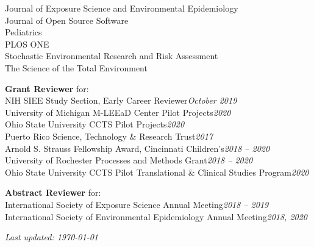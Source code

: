 \documentclass[margin,line]{res}
\newenvironment{list3}{
  \begin{list}{}{%
      \setlength{\itemsep}{0in}
      \setlength{\parsep}{0in} \setlength{\parskip}{0in}
      \setlength{\topsep}{0in} \setlength{\partopsep}{0in}
      \setlength{\leftmargin}{0in}}}{\end{list}}
\begin{document}
\begin{resume}
\begin{list3}
        Journal of Exposure Science and Environmental Epidemiology \\
        Journal of Open Source Software \\
        Pediatrics \\
        PLOS ONE \\
        Stochastic Environmental Research and Risk Assessment \\
        The Science of the Total Environment
\item[] \textbf{Grant Reviewer} for: \\
        NIH SIEE Study Section, Early Career Reviewer\hfill \textit{October 2019}\\
        University of Michigan M-LEEaD Center Pilot Projects\hfill \textit{2020}\\
        Ohio State University CCTS Pilot Projects\hfill \textit{2020}\\
        Puerto Rico Science, Technology \& Research Trust\hfill \textit{2017}\\
        Arnold S. Strauss Fellowship Award, Cincinnati Children's\hfill \textit{2018 -- 2020}\\
        University of Rochester Processes and Methods Grant\hfill \textit{2018
          -- 2020}\\
        Ohio State University CCTS Pilot Translational \& Clinical Studies
        Program\hfill \textit{2020}
\item[] \textbf{Abstract Reviewer} for: \\
        International Society of Exposure Science Annual Meeting\hfill \textit{2018 -- 2019}\\
        International Society of Environmental Epidemiology Annual Meeting\hfill \textit{2018, 2020}
\end{list3}

\end{resume}

\vfill

\hfill \textit{Last updated: \today}
\end{document}
